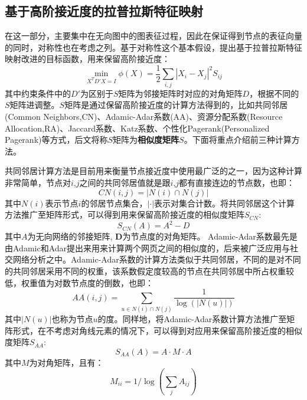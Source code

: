 \subsection{基于高阶接近度的拉普拉斯特征映射}
在这一部分，主要集中在无向图中的图表征过程，因此在保证得到节点的表征向量的同时，对称性也在考虑之列。基于对称性这个基本假设，提出基于拉普拉斯特征映射改进的目标函数，用来保留高阶接近度：
\begin{equation}\label{high_order_condition}
	\min_{X^TD'X=I} \phi(X) = \frac{1}{2}\sum_{i,j}|X_i - X_j|^2S_{ij} 
\end{equation}
其中约束条件中的$D'$为区别于$S$矩阵为邻接矩阵时对应的对角矩阵$D$，根据不同的$S$矩阵进调整。$S$矩阵是通过保留高阶接近度的计算方法得到的，比如共同邻居(Common Neighbors,CN)\cite{newman2001clustering}、Adamic-Adar系数(AA)\cite{adamic2003friends}、资源分配系数(Resource Allocation,RA)\cite{zhou2009predicting}、Jaccard系数、Katz系数、个性化Pagerank(Personalized Pagerank)\cite{wang2015link}等方式，后文将称$S$矩阵为\textbf{相似度矩阵$S$}。下面将重点介绍前三种计算方法。

共同邻居计算方法是目前用来衡量节点接近度中使用最广泛的之一，因为这种计算非常简单，节点对$i$,$j$之间的共同邻居值就是跟$i$,$j$都有直接连边的节点数，也即：
\begin{equation}
	CN(i,j) = |N(i) \cap N(j)|
\end{equation}
其中$N(i)$表示节点$i$的邻居节点集合，$|\cdot|$表示对集合计数。将共同邻居这个计算方法推广至矩阵形式，可以得到用来保留高阶接近度的相似度矩阵$S_{CN}$:
\begin{equation}
	S_{CN}(A) = A^2 - D
\end{equation}
其中$A$为无向网络的邻接矩阵, $\textbf{D}$为节点度的对角矩阵。
Adamic-Adar系数最先是由Adamic和Adar提出来用来计算两个网页之间的相似度的，后来被广泛应用与社交网络分析之中。Adamic-Adar系数的计算方法类似于共同邻居，不同的是对不同的共同邻居采用不同的权重，该系数假定度较高的节点在共同邻居中所占权重较低，权重值为对数节点度的倒数，也即：
\begin{equation}
	AA(i,j) = \sum_{u \in N(i)\cap N(j)} \frac{1}{\log(|N(u)|)}
\end{equation}
其中$|N(u)|$也称为节点$u$的度。同样地，将Adamic-Adar系数计算方法推广至矩阵形式，在不考虑对角线元素的情况下，可以得到对应用来保留高阶接近度的相似度矩阵$S_{AA}$:
\begin{equation}
	S_{AA}(A) = A \cdot M \cdot A
\end{equation}
其中$M$为对角矩阵，且有：
\begin{equation}
M_{ii} = 1/\log(\sum_j{A_{ij}})
\end{equation}

